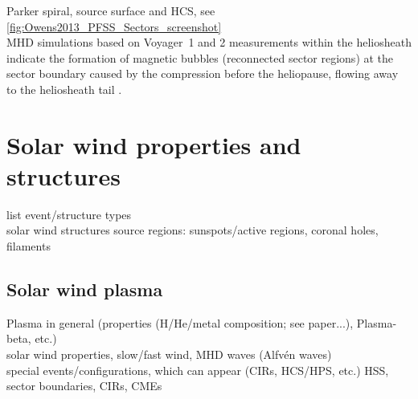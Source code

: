 Parker spiral, source surface and HCS, see \autoref{fig:Owens2013_PFSS_Sectors_screenshot}\\

MHD simulations based on Voyager~1 and 2 measurements within the heliosheath indicate the formation of magnetic bubbles (reconnected sector regions) at the sector boundary caused by the compression before the heliopause, flowing away to the heliosheath tail \citep{Opher2011}.\\


\section{Solar wind properties and structures}

list event/structure types\\
solar wind structures source regions: sunspots/active regions, coronal holes, filaments\\


\subsection{Solar wind plasma}
\label{sec:solar_wind_plasma}

Plasma in general (properties (H/He/metal composition; see paper...), Plasma-beta, etc.)\\
	solar wind properties, slow/fast wind, MHD waves (Alfv\'en waves)\\

special events/configurations, which can appear (CIRs, HCS/HPS, etc.)
HSS, sector boundaries, CIRs, CMEs\\


